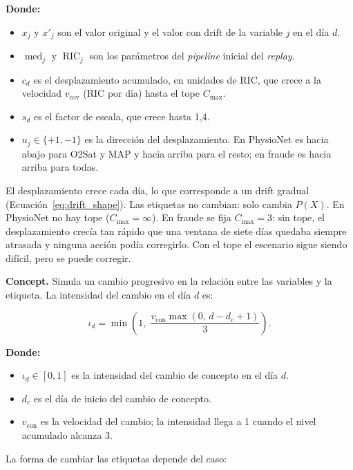 \noindent\textbf{Donde:}
\begin{itemize}
    \item $x_j$ y $x'_j$ son el valor original y el valor con drift de la variable $j$ en el día $d$.
    \item $\operatorname{med}_j$ y $\operatorname{RIC}_j$ son los parámetros del \textit{pipeline} inicial del \textit{replay}.
    \item $c_d$ es el desplazamiento acumulado, en unidades de RIC, que crece a la velocidad $v_{\text{cov}}$ (RIC por día) hasta el tope $C_{\max}$.
    \item $s_d$ es el factor de escala, que crece hasta 1,4.
    \item $u_j \in \{+1, -1\}$ es la dirección del desplazamiento. En PhysioNet es hacia abajo para O2Sat y MAP y hacia arriba para el resto; en fraude es hacia arriba para todas.
\end{itemize}

El desplazamiento crece cada día, lo que corresponde a un drift gradual
(Ecuación~\ref{eq:drift_shape}). Las etiquetas no cambian: solo cambia $P(X)$. En PhysioNet no
hay tope ($C_{\max} = \infty$). En fraude se fija $C_{\max} = 3$: sin tope, el desplazamiento
crecía tan rápido que una ventana de siete días quedaba siempre atrasada y ninguna acción podía
corregirlo. Con el tope el escenario sigue siendo difícil, pero se puede corregir.

\textbf{Concept.} Simula un cambio progresivo en la relación entre las variables y la etiqueta.
La intensidad del cambio en el día $d$ es:

\begin{equation}
    \iota_d = \min\!\left(1,\; \frac{v_{\text{con}} \max(0,\, d - d_c + 1)}{3}\right).
    \label{eq:concept_intensity}
\end{equation}

\noindent\textbf{Donde:}
\begin{itemize}
    \item $\iota_d \in [0, 1]$ es la intensidad del cambio de concepto en el día $d$.
    \item $d_c$ es el día de inicio del cambio de concepto.
    \item $v_{\text{con}}$ es la velocidad del cambio; la intensidad llega a 1 cuando el nivel acumulado alcanza 3.
\end{itemize}

La forma de cambiar las etiquetas depende del caso:

